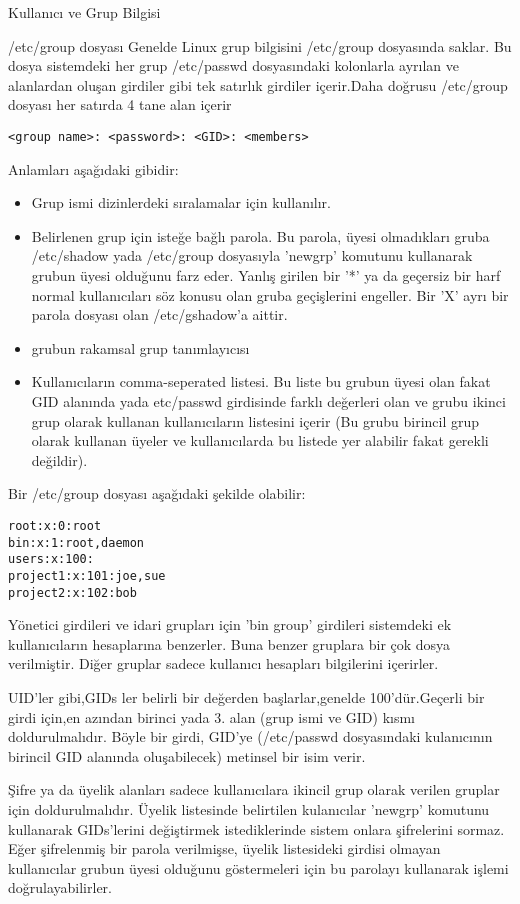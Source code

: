 \begin{section}{Kullanıcı ve Grup Bilgisi}
\begin{subsection}{/etc/group dosyası}
Genelde Linux grup bilgisini /etc/group dosyasında saklar. Bu dosya sistemdeki her grup /etc/passwd dosyasındaki kolonlarla ayrılan ve alanlardan oluşan girdiler gibi tek satırlık girdiler içerir.Daha doğrusu /etc/group dosyası her satırda 4 tane alan içerir
\begin{verbatim}
<group name>: <password>: <GID>: <members>
\end{verbatim}

Anlamları aşağıdaki gibidir:

\begin{itemize}
\item[group name]Grup ismi dizinlerdeki sıralamalar için kullanılır.
\item[password]Belirlenen grup için isteğe bağlı parola. Bu parola, üyesi olmadıkları gruba /etc/shadow yada /etc/group dosyasıyla 'newgrp' komutunu kullanarak grubun üyesi olduğunu farz eder. Yanlış girilen bir '*' ya da geçersiz bir harf normal kullanıcıları söz konusu olan gruba geçişlerini engeller. Bir 'X' ayrı bir parola dosyası olan /etc/gshadow'a aittir.
\item[GID]grubun rakamsal grup tanımlayıcısı
\item[members]Kullanıcıların comma-seperated listesi. Bu liste bu grubun üyesi olan fakat GID alanında yada etc/passwd girdisinde farklı değerleri olan ve grubu ikinci grup olarak kullanan kullanıcıların listesini içerir (Bu grubu birincil grup olarak kullanan üyeler ve kullanıcılarda bu listede yer alabilir fakat gerekli değildir).
\end{itemize}

Bir /etc/group dosyası aşağıdaki şekilde olabilir:
\begin{verbatim}
root:x:0:root
bin:x:1:root,daemon
users:x:100:
project1:x:101:joe,sue
project2:x:102:bob
\end{verbatim}

Yönetici girdileri ve idari grupları için 'bin group' girdileri sistemdeki ek kullanıcıların hesaplarına benzerler. Buna benzer gruplara bir çok dosya verilmiştir. Diğer gruplar sadece kullanıcı hesapları bilgilerini içerirler.

UID'ler gibi,GIDs ler belirli bir değerden başlarlar,genelde 100'dür.Geçerli bir girdi için,en azından birinci yada 3. alan (grup ismi ve GID) kısmı doldurulmalıdır. Böyle bir girdi, GID'ye (/etc/passwd dosyasındaki kulanıcının birincil GID alanında oluşabilecek) metinsel bir isim verir.

Şifre ya da üyelik alanları sadece kullanıcılara ikincil grup olarak verilen gruplar için doldurulmalıdır. Üyelik listesinde belirtilen kulanıcılar 'newgrp' komutunu kullanarak GIDs'lerini değiştirmek istediklerinde sistem onlara şifrelerini sormaz. Eğer şifrelenmiş bir parola verilmişse, üyelik listesideki girdisi olmayan kullanıcılar grubun üyesi olduğunu göstermeleri için bu parolayı kullanarak işlemi doğrulayabilirler.


\end{subsection}
\end{section}
